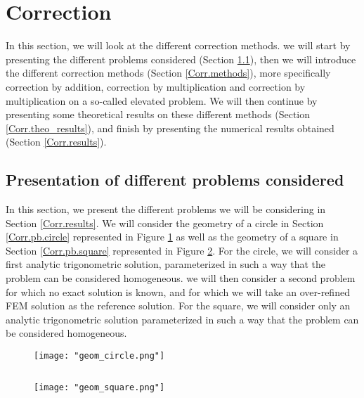 \section{Correction} \label{Corr}
\graphicspath{{images/corr}}

In this section, we will look at the different correction methods. we will start by presenting the different problems considered (Section \ref{Corr.problems}), then we will introduce the different correction methods (Section \ref{Corr.methods}), more specifically correction by addition, correction by multiplication and correction by multiplication on a so-called elevated problem. We will then continue by presenting some theoretical results on these different methods (Section \ref{Corr.theo_results}), and finish by presenting the numerical results obtained (Section \ref{Corr.results}).

\subsection{Presentation of different problems considered} \label{Corr.problems}

In this section, we present the different problems we will be considering in Section \ref{Corr.results}. We will consider the geometry of a circle in Section \ref{Corr.pb.circle} represented in Figure \ref{geom_circle} as well as the geometry of a square in Section \ref{Corr.pb.square} represented in Figure \ref{geom_square}. For the circle, we will consider a first analytic trigonometric solution, parameterized in such a way that the problem can be considered homogeneous. we will then consider a second problem for which no exact solution is known, and for which we will take an over-refined FEM solution as the reference solution. For the square, we will consider only an analytic trigonometric solution parameterized in such a way that the problem can be considered homogeneous.

\begin{minipage}{0.48\linewidth}
	\begin{figure}[H]
		\centering
		\texttt{[image: "geom\_circle.png"]}
		\label{geom_circle}
	\end{figure} 
\end{minipage} $\qquad$
\begin{minipage}{0.48\linewidth}
	\begin{figure}[H]
		\centering
		\texttt{[image: "geom\_square.png"]}
		\label{geom_square}
	\end{figure} 
\end{minipage}

